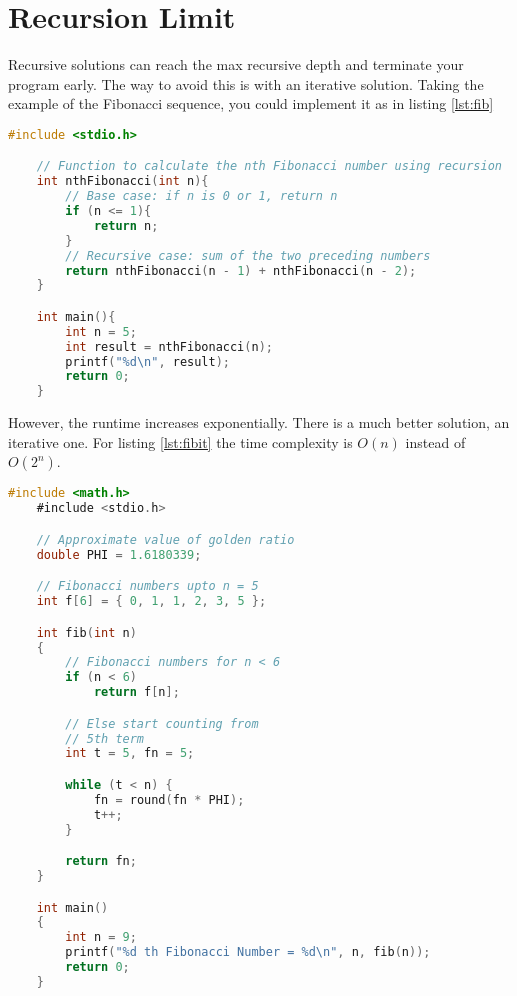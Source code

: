\section{Recursion Limit}

Recursive solutions can reach the max recursive depth and
terminate your program early. The way to avoid this is with
an iterative solution. Taking the example of the Fibonacci
sequence, you could implement it as in listing \ref{lst:fib}

\begin{lstlisting}[language=C, caption=Singly Linked List Node Structure]
    #include <stdio.h>

    // Function to calculate the nth Fibonacci number using recursion
    int nthFibonacci(int n){
        // Base case: if n is 0 or 1, return n
        if (n <= 1){
            return n;
        }
        // Recursive case: sum of the two preceding numbers
        return nthFibonacci(n - 1) + nthFibonacci(n - 2);
    }

    int main(){
        int n = 5;
        int result = nthFibonacci(n);
        printf("%d\n", result);
        return 0;
    }
\end{lstlisting}
\label{lst:fib}

However, the runtime increases exponentially.
There is a much better solution, an iterative one.
For listing \ref{lst:fibit} the time complexity is $O(n)$
instead of $O(2^n)$.


\begin{lstlisting}[language=C, caption=Singly Linked List Node Structure]
    #include <math.h>
    #include <stdio.h>

    // Approximate value of golden ratio
    double PHI = 1.6180339;

    // Fibonacci numbers upto n = 5
    int f[6] = { 0, 1, 1, 2, 3, 5 };

    int fib(int n)
    {
        // Fibonacci numbers for n < 6
        if (n < 6)
            return f[n];

        // Else start counting from
        // 5th term
        int t = 5, fn = 5;

        while (t < n) {
            fn = round(fn * PHI);
            t++;
        }

        return fn;
    }

    int main()
    {
        int n = 9;
        printf("%d th Fibonacci Number = %d\n", n, fib(n));
        return 0;
    }
\end{lstlisting}